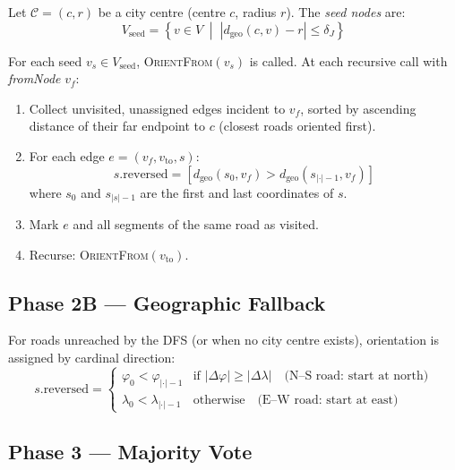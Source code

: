 \documentclass[12pt,a4paper]{article}
\theoremstyle{definition}
\theoremstyle{plain}
\theoremstyle{remark}
\newcommand{\abs}[1]{\left\lvert #1 \right\rvert}
\begin{document}
Let $\mathcal{C} = (c, r)$ be a city centre (centre $c$, radius $r$).
The \emph{seed nodes} are:
\begin{equation}
  V_{\text{seed}} = \left\{ v \in V \;\middle|\;
    \abs{d_{\text{geo}}(c, v) - r} \leq \delta_J
  \right\}
  \label{eq:seed_nodes}
\end{equation}

For each seed $v_s \in V_{\text{seed}}$, \textsc{OrientFrom}$(v_s)$ is called.
At each recursive call with \textit{fromNode} $v_f$:
\begin{enumerate}
  \item Collect unvisited, unassigned edges incident to $v_f$, sorted by
    ascending distance of their far endpoint to $c$
    (closest roads oriented first).
  \item For each edge $e = (v_f, v_{\text{to}}, s)$:
    \begin{equation}
      s.\mathrm{reversed} = \left[
        d_{\text{geo}}(s_0, v_f) > d_{\text{geo}}(s_{|\cdot|-1}, v_f)
      \right]
      \label{eq:segment_orient}
    \end{equation}
    where $s_0$ and $s_{|s|-1}$ are the first and last coordinates of $s$.
  \item Mark $e$ and all segments of the same road as visited.
  \item Recurse: \textsc{OrientFrom}$(v_{\text{to}})$.
\end{enumerate}

\subsection{Phase 2B — Geographic Fallback}

For roads unreached by the DFS (or when no city centre exists), orientation
is assigned by cardinal direction:
\begin{equation}
  s.\mathrm{reversed} =
  \begin{cases}
    \varphi_0 < \varphi_{|\cdot|-1} & \text{if } |\Delta\varphi| \geq |\Delta\lambda| \quad
      \text{(N--S road: start at north)} \\
    \lambda_0 < \lambda_{|\cdot|-1} & \text{otherwise} \quad
      \text{(E--W road: start at east)}
  \end{cases}
  \label{eq:geographic_fallback}
\end{equation}

\subsection{Phase 3 — Majority Vote}
\end{document}

